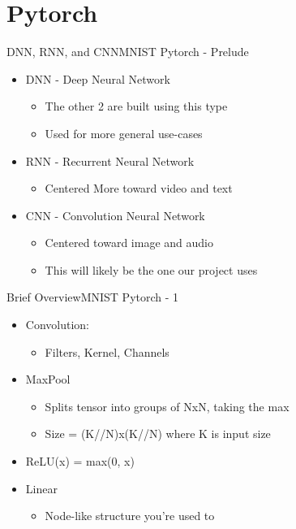 \documentclass{beamer}
\begin{document}
	\section{Pytorch}
		\begin{frame}{DNN, RNN, and CNN}{MNIST Pytorch - Prelude}
			\begin{itemize}
				\item DNN - Deep Neural Network 
				\begin{itemize}
					\item The other 2 are built using this type
					\item Used for more general use-cases
				\end{itemize}
					
				\item RNN - Recurrent Neural Network 
				\begin{itemize}
					\item Centered More toward video and text
				\end{itemize}
					
				\item CNN - Convolution Neural Network 
				\begin{itemize}
					\item Centered toward image and audio
					\item This will likely be the one our project uses
				\end{itemize}
			\end{itemize}
		\end{frame}

		\begin{frame}{Brief Overview}{MNIST Pytorch - 1}
			\begin{itemize}
				\item Convolution: 
				\begin{itemize}
					\item Filters, Kernel, Channels
				\end{itemize}
				\item MaxPool
				\begin{itemize}
					\item Splits tensor into groups of NxN, taking the max
					\item Size = (K//N)x(K//N) where K is input size 
				\end{itemize}
				\item ReLU(x) = max(0, x)
				\item Linear
				\begin{itemize}
					\item Node-like structure you’re used to
				\end{itemize}
			\end{itemize}
		\end{frame}
\end{document}
